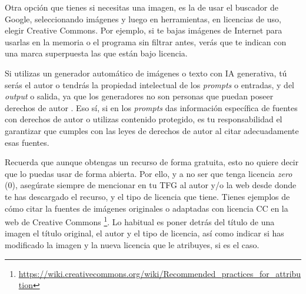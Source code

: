 
Otra opción que tienes si necesitas una imagen, es la de usar el buscador de Google, seleccionando imágenes y luego en herramientas, en licencias de uso, elegir Creative Commons. Por ejemplo, si te bajas imágenes de Internet para usarlas en la memoria o el programa sin filtrar antes, verás que te indican con una marca superpuesta las que están bajo licencia. 


Si utilizas un generador automático de imágenes o texto con IA generativa, tú serás el autor o tendrás la propiedad intelectual de los \textit{prompts} o entradas, y del \textit{output} o salida, ya que los generadores no son personas que puedan poseer derechos de autor \cite{derechosautorIA}. Eso sí, si en los \textit{prompts} das información específica de fuentes con derechos de autor o utilizas contenido protegido, es tu responsabilidad el garantizar que cumples con las leyes de derechos de autor al citar adecuadamente esas fuentes.

Recuerda que aunque obtengas un recurso de forma gratuita, esto no quiere decir que lo puedas usar de forma abierta. Por ello, y a no ser que tenga licencia \textit{zero} (0), asegúrate siempre de mencionar en tu TFG al autor y/o la web desde donde te has descargado el recurso, y el tipo de licencia que tiene. Tienes ejemplos de cómo citar la fuentes de imágenes originales o adaptadas con licencia CC en la web de Creative Commons \footnote{\url{https://wiki.creativecommons.org/wiki/Recommended_practices_for_attribution}}. Lo habitual es poner detrás del título de una imagen el título original, el autor y el tipo de licencia, así como indicar si has modificado la imagen y la nueva licencia que le atribuyes, si es el caso.

